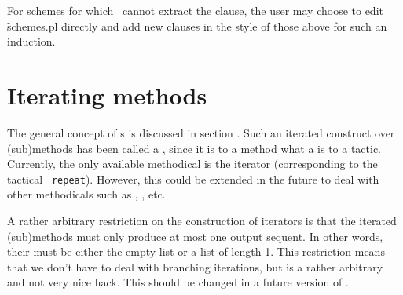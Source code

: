 For schemes for which \clam\ cannot extract the  clause,
the user may choose to edit \f{schemes.pl} directly and add new
clauses in the style of those above for such an induction.

\section {Iterating methods}
\label{iterators}

The general concept of s is discussed in section
. Such an iterated construct over (sub)methods
has been called a {\em {}}, since it is to a method what
a  is to a tactic. Currently, the only available
methodical is the iterator (corresponding to the tactical {\tt \inx
{repeat}}). However, this could be extended in the future to deal with
other methodicals such as , , etc.

A rather arbitrary restriction on the construction of iterators
is that the iterated (sub)methods must only produce at
most one output sequent. In other words, their  must
be either the empty list or a list of length 1. This restriction
\notnice
means that we don't have to deal with branching iterations, but is a
rather arbitrary and not very nice hack. This should be changed in a 
future version of \clam.


